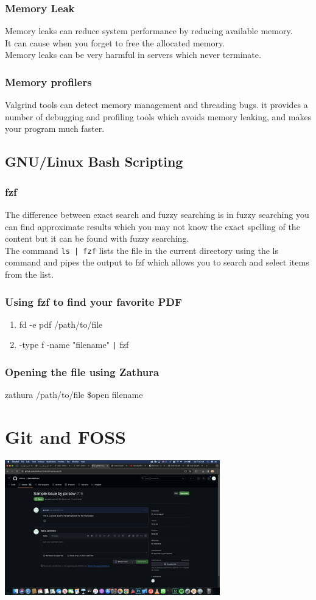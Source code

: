 \documentclass{article}
\begin{document}
\subsubsection{Memory Leak}
Memory leaks can reduce system performance by reducing available memory.\\
It can cause when you forget to free the allocated memory.\\
Memory leaks can be very harmful in servers which never terminate.
\subsubsection{Memory profilers}
Valgrind tools can detect memory management and threading bugs. it provides a number of debugging and profiling tools which avoids memory leaking, and makes your program much faster.
\subsection{GNU/Linux Bash Scripting}
\subsubsection{fzf}
The difference between exact search and fuzzy searching is in fuzzy searching you can find approximate results which you may not know the exact spelling of the content but it can be found with fuzzy searching.\\
The command \texttt{ls | fzf} lists the file in the current directory using the ls command and pipes the output to fzf which allows you to search and select items from the list.
\subsubsection{Using fzf to find your favorite PDF}
\begin{enumerate}
    \item fd -e pdf /path/to/file
    \item -type f -name "filename" \texttt{|} fzf
\end{enumerate}
\subsubsection{Opening the file using Zathura}
zathura /path/to/file \$open filename
\section{Git and FOSS}
\includegraphics[width=0.7\textwidth]{finalproj.png}
\end{document}

